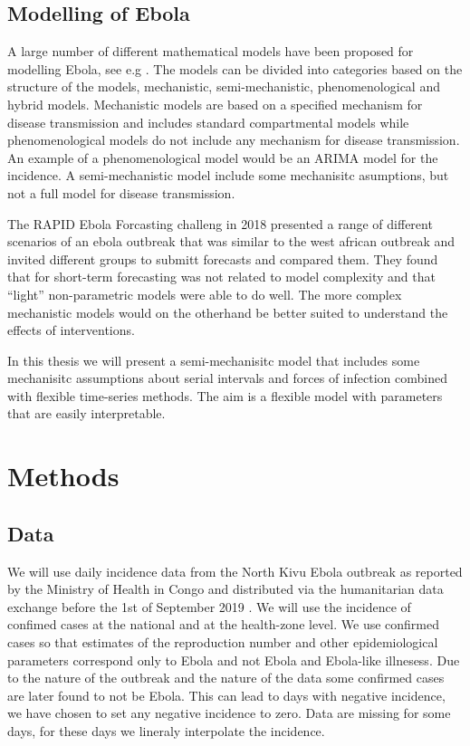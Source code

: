 \documentclass[12pt]{article}
\begin{document}
\subsection{Modelling of Ebola}

A large number of different mathematical models have been proposed for modelling Ebola, see e.g \cite{chretienMathematicalModelingWest,viboudRAPIDDEbolaForecasting2018}. The models can be divided into categories based on the structure of the models, mechanistic, semi-mechanistic, phenomenological and hybrid models. Mechanistic models are based on a specified mechanism for disease transmission and includes standard compartmental models while phenomenological models do not include any mechanism for disease transmission. An example of a phenomenological model would be an ARIMA model for the incidence. A semi-mechanistic model include some mechanisitc asumptions, but not a full model for disease transmission.

The RAPID Ebola Forcasting challeng in 2018 \cite{viboudRAPIDDEbolaForecasting2018} presented a range of different scenarios of an ebola outbreak that was similar to the west african outbreak and invited different groups to submitt forecasts and compared them. They found that for short-term forecasting was not related to model complexity and that ``light'' non-parametric models were able to do well. The more complex mechanistic models would on the otherhand be better suited to understand the effects of interventions. 

In this thesis we will present a semi-mechanisitc model that includes some mechanisitc assumptions about serial intervals and forces of infection combined with flexible time-series methods. The aim is a flexible model with parameters that are easily interpretable. 

\section{Methods}

\subsection{Data}
We will use daily incidence data from the North Kivu Ebola outbreak as reported by the Ministry of Health in Congo and distributed via the humanitarian data exchange before the 1st of September 2019 \cite{EbolaCasesDeaths}. We will use the incidence of confimed cases at the national and at the health-zone level. We use confirmed cases so that estimates of the reproduction number and other epidemiological parameters correspond only to Ebola and not Ebola and Ebola-like illnesess. Due to the nature of the outbreak and the nature of the data some confirmed cases are later found to not be Ebola. This can lead to days with negative incidence, we have chosen to set any negative incidence to zero. Data are missing for some days, for these days we lineraly interpolate the incidence. 
\end{document}
